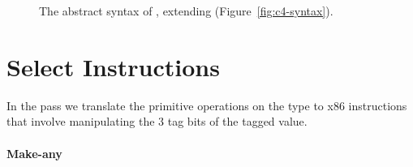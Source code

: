 \documentclass[11pt]{book}
\newcommand{\gray}[1]{{\color{gray} #1}}
\begin{document}
\begin{figure}[tp]
\fbox{
\begin{minipage}{0.96\textwidth}
\small
\[
\begin{array}{lcl}
\Exp &::= & \ldots
   \mid \BINOP{\key{'any-vector-ref}}{\Atm}{\Atm}  \\
   &\mid& (\key{Prim}~\key{'any-vector-set!}\,(\key{list}\,\Atm\,\Atm\,\Atm))\\
   &\mid& \VALUEOF{\Exp}{\FType} \\
\Stmt &::=& \gray{ \ASSIGN{\VAR{\Var}}{\Exp} 
  \mid \LP\key{Collect} \,\itm{int}\RP }\\
\Tail &::= & \gray{ \RETURN{\Exp} \mid \SEQ{\Stmt}{\Tail} 
       \mid \GOTO{\itm{label}} } \\
    &\mid& \gray{ \IFSTMT{\BINOP{\itm{cmp}}{\Atm}{\Atm}}{\GOTO{\itm{label}}}{\GOTO{\itm{label}}}  }\\
&\mid& \gray{ \TAILCALL{\Atm}{\Atm\ldots} } 
  \mid \LP\key{Exit}\RP \\
\Def &::=& \gray{ \DEF{\itm{label}}{\LP[\Var\key{:}\Type]\ldots\RP}{\Type}{\itm{info}}{\LP\LP\itm{label}\,\key{.}\,\Tail\RP\ldots\RP} }\\
\LangCLam{} & ::= & \gray{ \PROGRAMDEFS{\itm{info}}{\LP\Def\ldots\RP} }
\end{array}
\]
\end{minipage}
}
\caption{The abstract syntax of \LangCAny{}, extending \LangCLam{} (Figure~\ref{fig:c4-syntax}).}
\label{fig:c5-syntax}
\end{figure}


\section{Select Instructions}
\label{sec:select-Rany}

In the  pass we translate the primitive
operations on the  type to x86 instructions that involve
manipulating the 3 tag bits of the tagged value.

\paragraph{Make-any}
\end{document}
